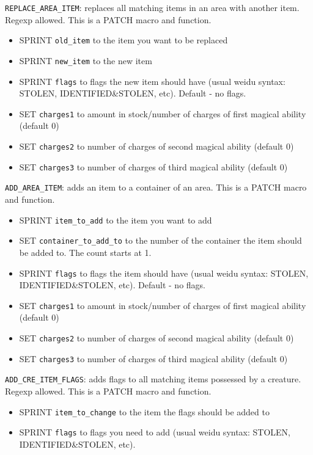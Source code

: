 \documentclass{article}
\begin{document}
\verb+REPLACE_AREA_ITEM+: replaces all matching items in an area with another item. Regexp allowed.
This is a PATCH macro and function.
\begin{itemize}
\item SPRINT \verb+old_item+ to the item you want to be replaced
\item SPRINT \verb+new_item+ to the new item
\item SPRINT \verb+flags+ to flags the new item should have (usual weidu syntax: STOLEN, IDENTIFIED&STOLEN, etc). Default - no flags.
\item SET \verb+charges1+ to amount in stock/number of charges of first magical ability (default 0)
\item SET \verb+charges2+ to number of charges of second magical ability (default 0)
\item SET \verb+charges3+ to number of charges of third magical ability (default 0)
\end{itemize}

\verb+ADD_AREA_ITEM+: adds an item to a container of an area.
This is a PATCH macro and function.
\begin{itemize}
\item SPRINT \verb+item_to_add+ to the item you want to add
\item SET \verb+container_to_add_to+ to the number of the container the item should be added to. The count starts at 1.
\item SPRINT \verb+flags+ to flags the item should have (usual weidu syntax: STOLEN, IDENTIFIED&STOLEN, etc). Default - no flags.
\item SET \verb+charges1+ to amount in stock/number of charges of first magical ability (default 0)
\item SET \verb+charges2+ to number of charges of second magical ability (default 0)
\item SET \verb+charges3+ to number of charges of third magical ability (default 0)
\end{itemize}

\verb+ADD_CRE_ITEM_FLAGS+: adds flags to all matching items possessed by a creature. Regexp allowed.
This is a PATCH macro and function.
\begin{itemize}
\item SPRINT \verb+item_to_change+ to the item the flags should be added to
\item SPRINT \verb+flags+ to flags you need to add (usual weidu syntax: STOLEN, IDENTIFIED&STOLEN, etc).
\end{itemize}
\end{document}
